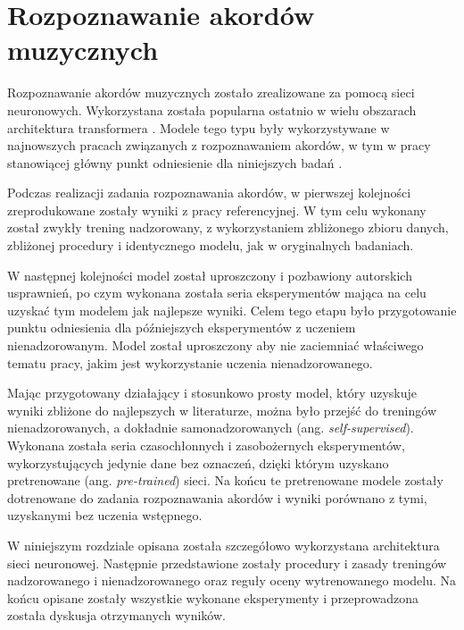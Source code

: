 \chapter{Rozpoznawanie akordów muzycznych}

Rozpoznawanie akordów muzycznych zostało zrealizowane za pomocą sieci neuronowych. Wykorzystana
została popularna ostatnio w wielu obszarach architektura transformera
\cite{vaswani_attention_2017}. Modele tego typu były wykorzystywane w najnowszych pracach związanych
z rozpoznawaniem akordów, w tym w pracy stanowiącej główny punkt odniesienie dla niniejszych badań
\cite{park_bi-directional_2019}.

Podczas realizacji zadania rozpoznawania akordów, w pierwszej kolejności zreprodukowane zostały
wyniki z pracy referencyjnej. W tym celu wykonany został zwykły trening nadzorowany, z
wykorzystaniem zbliżonego zbioru danych, zbliżonej procedury i identycznego modelu, jak w
oryginalnych badaniach.

W następnej kolejności model został uproszczony i pozbawiony autorskich usprawnień, po czym wykonana
została seria eksperymentów mająca na celu uzyskać tym modelem jak najlepsze wyniki. Celem tego
etapu było przygotowanie punktu odniesienia dla późniejszych eksperymentów z uczeniem
nienadzorowanym. Model został uproszczony aby nie zaciemniać właściwego tematu pracy, jakim jest
wykorzystanie uczenia nienadzorowanego.

Mając przygotowany działający i stosunkowo prosty model, który uzyskuje wyniki zbliżone do
najlepszych w literaturze, można było przejść do treningów nienadzorowanych, a dokładnie
samonadzorowanych (ang. \emph{self-supervised}). Wykonana została seria czasochłonnych i
zasobożernych eksperymentów, wykorzystujących jedynie dane bez oznaczeń, dzięki którym uzyskano
pretrenowane (ang. \emph{pre-trained}) sieci. Na końcu te pretrenowane modele zostały dotrenowane do
zadania rozpoznawania akordów i wyniki porównano z tymi, uzyskanymi bez uczenia wstępnego.

W niniejszym rozdziale opisana została szczegółowo wykorzystana architektura sieci neuronowej.
Następnie przedstawione zostały procedury i zasady treningów nadzorowanego i nienadzorowanego oraz
reguły oceny wytrenowanego modelu. Na końcu opisane zostały wszystkie wykonane eksperymenty i
przeprowadzona została dyskusja otrzymanych wyników.

